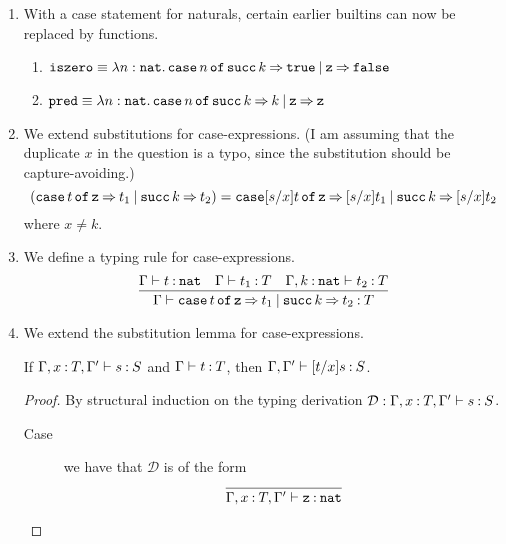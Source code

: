 \documentclass[11pt,letterpaper]{article}
\newcommand{\iszero}{\operatorname{\mathtt{iszero}}}
\renewcommand{\succ}{\operatorname{\mathtt{succ}}}
\newcommand{\pred}{\operatorname{\mathtt{pred}}}
\newcommand{\nat}{\mathtt{nat}}
\newcommand{\case}[1]{\operatorname{\mathtt{case}}#1\operatorname{\mathtt{of}}}
\begin{document}
\begin{enumerate}
  \item
    With a case statement for naturals, certain earlier builtins can now be
    replaced by functions.
    \begin{enumerate}
      \item
        $%
        \iszero \equiv \lambda n : \nat.
        \case{n} \succ k \goesto \true
        \orcase \mathtt{z} \goesto \false
        $

      \item
        $%
        \pred \equiv \lambda n : \nat.
        \case{n} \succ k \goesto k
        \orcase \mathtt{z} \goesto \mathtt{z}
        $
    \end{enumerate}

  \item
    We extend substitutions for case-expressions.
    (I am assuming that the duplicate $x$ in the question is a typo,
    since the substitution should be capture-avoiding.)
    \begin{equation*}
      [s/x](\case{t} \mathtt{z} \goesto t_1 \orcase \succ k \goesto t_2)
      =
      \case{[s/x]t}
      \mathtt{z} \goesto [s/x]t_1
      \orcase \succ k \goesto [s/x]t_2
    \end{equation*}
    where $x \neq k$.

  \item
    We define a typing rule for case-expressions.
    \begin{equation*}
      \infer{%
        \Gamma \proves
        \case{t} \mathtt{z} \goesto t_1
        \orcase \succ k \goesto t_2
        \hastype T
      }{%
        \Gamma \proves t \hastype \nat
        &
        \Gamma \proves t_1 \hastype T
        &
        \Gamma, k \hastype \nat \proves t_2 \hastype T%
      }
    \end{equation*}

  \item
    We extend the substitution lemma for case-expressions.
    \begin{prop}
      If $\Gamma, x \mathbin{:} T, \Gamma^\prime \vdash s \mathbin{:} S$
      and $\Gamma \vdash t \mathbin{:} T$,
      then $\Gamma, \Gamma^\prime \vdash [t/x]s \mathbin{:} S$.
    \end{prop}
    \begin{proof}
      By structural induction on the typing derivation
      $\mathcal{D} : \Gamma, x \mathbin{:} T, \Gamma^\prime \vdash s \mathbin{:} S$.
      \begin{description}
        \item[Case] we have that $\mathcal{D}$ is of the form
          \begin{equation*}
            \infer{%
              \Gamma, x \hastype T, \Gamma^\prime
              \proves \mathtt{z} \hastype \nat%
            }{}
          \end{equation*}


\end{description}
\end{proof}
\end{enumerate}
\end{document}
